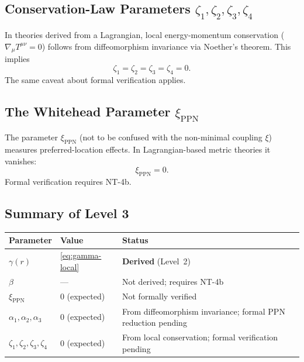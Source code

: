 \documentclass[11pt,a4paper]{article}
\begin{document}
\subsection{Conservation-Law Parameters
  \texorpdfstring{$\zeta_1, \zeta_2, \zeta_3, \zeta_4$}{zeta\_1, ..., zeta\_4}}

In theories derived from a Lagrangian, local energy-momentum conservation
($\nabla_\mu T^{\mu\nu} = 0$) follows from diffeomorphism invariance via
Noether's theorem.  This implies
\begin{equation}
  \zeta_1 = \zeta_2 = \zeta_3 = \zeta_4 = 0.
\end{equation}
The same caveat about formal verification applies.

\subsection{The Whitehead Parameter
  \texorpdfstring{$\xi_\mathrm{PPN}$}{xi\_PPN}}

The parameter $\xi_\mathrm{PPN}$ (not to be confused with the
non-minimal coupling $\xi$) measures preferred-location effects.
In Lagrangian-based metric theories it vanishes:
\begin{equation}
  \xi_\mathrm{PPN} = 0.
\end{equation}
Formal verification requires NT-4b.

\subsection{Summary of Level 3}

\begin{center}
\begin{tabular}{llp{6cm}}
\toprule
Parameter & Value & Status \\
\midrule
$\gamma(r)$ & \cref{eq:gamma-local} & \textbf{Derived} (Level~2) \\
$\beta$ & --- & Not derived; requires NT-4b \\
$\xi_\mathrm{PPN}$ & $0$ (expected) & Not formally verified \\
$\alpha_1, \alpha_2, \alpha_3$ & $0$ (expected) & From diffeomorphism
  invariance; formal PPN reduction pending \\
$\zeta_1, \zeta_2, \zeta_3, \zeta_4$ & $0$ (expected) & From local
  conservation; formal verification pending \\
\bottomrule
\end{tabular}
\end{center}
\end{document}
